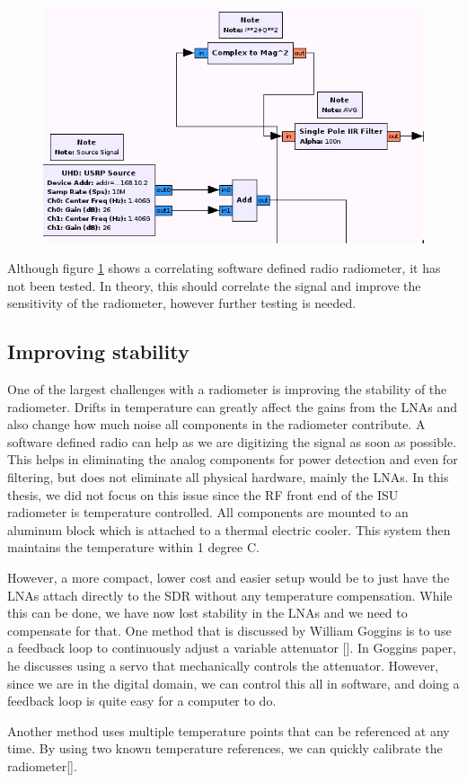{\begin{figure}[h!tb] 
\centering
\includegraphics[width=14cm]{Images/N200_rad_corr.png}
\label{correlating_sdr}
\end{figure}
}

Although figure \ref{correlating_sdr} shows a correlating software defined radio radiometer, it has not been tested.  In theory, this should correlate the signal and improve the sensitivity of the radiometer, however further testing is needed.

\subsection{Improving stability}

One of the largest challenges with a radiometer is improving the stability of the radiometer.  Drifts in temperature can greatly affect the gains from the LNAs and also change how much noise all components in the radiometer contribute.  A software defined radio can help as we are digitizing the signal as soon as possible.  This helps in eliminating the analog components for power detection and even for filtering, but does not eliminate all physical hardware, mainly the LNAs.  In this thesis, we did not focus on this issue since the RF front end of the ISU radiometer is temperature controlled.  All components are mounted to an aluminum block which is attached to a thermal electric cooler.  This system then maintains the temperature within 1 degree C.  

However, a more compact, lower cost and easier setup would be to just have the LNAs attach directly to the SDR without any temperature compensation.  While this can be done, we have now lost stability in the LNAs and we need to compensate for that.  One method that is discussed by William Goggins is to use a feedback loop to continuously adjust a variable attenuator [\cite{Goggins}].  In Goggins paper, he discusses using a servo that mechanically controls the attenuator.  However, since we are in the digital domain, we can control this all in software, and doing a feedback loop is quite easy for a computer to do.  

Another method uses multiple temperature points that can be referenced at any time.  By using two known temperature references, we can quickly calibrate the radiometer[\cite{Hach}].  